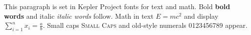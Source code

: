 \documentclass{article}
\begin{document}
This paragraph is set in Kepler Project fonts for text and math.
Bold \textbf{bold words} and italic \textit{italic words} follow.
Math in text $E = mc^2$ and display $\sum_{i=1}^{n} x_i = \frac{a}{b}$.
Small caps \textsc{Small Caps} and old-style numerals 0123456789 appear.
\end{document}
